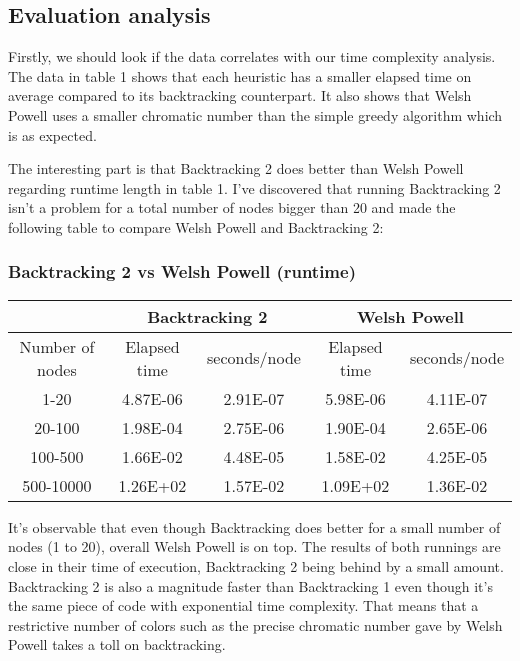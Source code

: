 \documentclass[runningheads]{llncs}
\begin{document}
\subsection{Evaluation analysis}

Firstly, we should look if the data correlates with our time complexity analysis.
The data in table 1 shows that each heuristic has a smaller elapsed time on average
compared to its backtracking counterpart. It also shows that Welsh Powell uses
a smaller chromatic number than the simple greedy algorithm which is as expected.

The interesting part is that Backtracking 2
does better than Welsh Powell regarding runtime length in table 1. I've discovered that running
Backtracking 2 isn't a problem for a total number of nodes bigger than 20 and
made the following table to compare Welsh Powell and Backtracking 2:
\subsubsection{Backtracking 2 vs Welsh Powell (runtime)}
\begin{center}
	\begin{tabular}{ |c|c|c|c|c| } 
		\hline
		& \multicolumn{2}{|c|}{Backtracking 2} & \multicolumn{2}{|c|}{Welsh Powell} \\
		\hline
		Number of nodes & Elapsed time & seconds/node & Elapsed time & seconds/node \\
		\hline
		1-20 & 4.87E-06 & 2.91E-07 & 5.98E-06 & 4.11E-07 \\
		20-100 & 1.98E-04 & 2.75E-06 & 1.90E-04 & 2.65E-06 \\
		100-500 & 1.66E-02 & 4.48E-05 & 1.58E-02 & 4.25E-05 \\
		500-10000 & 1.26E+02 & 1.57E-02 & 1.09E+02 & 1.36E-02 \\
		\hline
	\end{tabular}
\end{center}
\vspace{1em}
It's observable that even though Backtracking does better for a small number of nodes
(1 to 20), overall Welsh Powell is on top. The results of both runnings
are close in their time of execution, Backtracking 2 being behind by a small amount.
Backtracking 2 is also a magnitude faster than Backtracking 1 even though it's the same piece
of code with exponential time complexity. That means that a restrictive number of colors such
as the precise chromatic number gave by Welsh Powell takes a toll on backtracking. 
\end{document}
